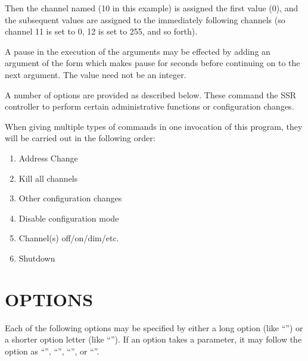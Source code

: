 Then the channel named (10 in this example) is assigned the first value
(0), and the subsequent values are assigned to the immediately following
channels (so channel 11 is set to 0, 12 is set to 255, and so forth).


A pause in the execution of the arguments may be effected by adding an
argument of the form 
which makes
pause for
seconds before continuing on to the next argument.  The
value need not be an integer.


A number of options are provided as described below.  These command
the SSR controller to perform certain administrative functions or 
configuration changes.


When giving multiple types of commands in one invocation of this
program, they will be carried out in the following order:
\begin{enumerate}
\item
Address Change
\item
Kill all channels
\item
Other configuration changes
\item
Disable configuration mode
\item
Channel(s) off/on/dim/etc.
\item
Shutdown
\end{enumerate}
\section*{OPTIONS}


Each of the following options may be specified by either a long
option (like
``'')
or a shorter option letter (like
``'').
If an option takes a parameter, it may follow the option as
``'',
``'',
``'',
or
``''.


